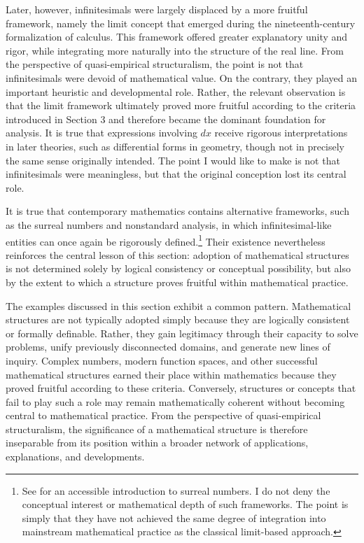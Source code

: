 \documentclass[11pt,a4paper]{book}
\theoremstyle{plain}
\begin{document}
Later, however, infinitesimals were largely displaced by a more fruitful framework, namely the limit concept that emerged during the nineteenth-century formalization of calculus. This framework offered greater explanatory unity and rigor, while integrating more naturally into the structure of the real line. From the perspective of quasi-empirical structuralism, the point is not that infinitesimals were devoid of mathematical value. On the contrary, they played an important heuristic and developmental role. Rather, the relevant observation is that the limit framework ultimately proved more fruitful according to the criteria introduced in Section 3 and therefore became the dominant foundation for analysis. It is true that expressions involving $dx$ receive rigorous interpretations in later theories, such as differential forms in geometry, though not in precisely the same sense originally intended. The point I would like to make is not that infinitesimals were meaningless, but that the original conception lost its central role.

It is true that contemporary mathematics contains alternative frameworks, such as the surreal numbers and nonstandard analysis, in which infinitesimal-like entities can once again be rigorously defined.\footnote{See \textcite{Knuth1974} for an accessible introduction to surreal numbers. I do not deny the conceptual interest or mathematical depth of such frameworks. The point is simply that they have not achieved the same degree of integration into mainstream mathematical practice as the classical limit-based approach.} Their existence nevertheless reinforces the central lesson of this section: adoption of mathematical structures is not determined solely by logical consistency or conceptual possibility, but also by the extent to which a structure proves fruitful within mathematical practice.

The examples discussed in this section exhibit a common pattern. Mathematical structures are not typically adopted simply because they are logically consistent or formally definable. Rather, they gain legitimacy through their capacity to solve problems, unify previously disconnected domains, and generate new lines of inquiry. Complex numbers, modern function spaces, and other successful mathematical structures earned their place within mathematics because they proved fruitful according to these criteria. Conversely, structures or concepts that fail to play such a role may remain mathematically coherent without becoming central to mathematical practice. From the perspective of quasi-empirical structuralism, the significance of a mathematical structure is therefore inseparable from its position within a broader network of applications, explanations, and developments.
\end{document}
